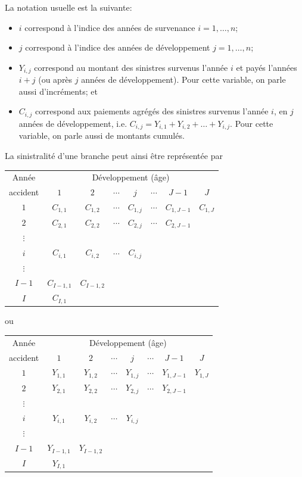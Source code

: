 La notation usuelle est la suivante:
\begin{itemize}
\item $i$ correspond à l'indice des années de survenance
  $i=1,\ldots,n$;
\item $j$ correspond à l'indice des années de développement
  $j=1,\ldots,n$;
\item $Y_{i,j}$ correspond au montant des sinistres survenus l'année
  $i$ et payés l'années $i+j$ (ou après $j$ années de développement).
  Pour cette variable, on parle aussi d'incréments; et
\item $C_{i,j}$ correspond aux paiements agrégés des sinistres
  survenus l'année $i$, en $j$ années de développement, i.e.
  $C_{i,j} = Y_{i,1} + Y_{i,2}+\ldots+Y_{i,j}$. Pour cette variable,
  on parle aussi de montants cumulés.
\end{itemize}

La sinistralité d'une branche peut ainsi être représentée par
\begin{center}
  \begin{tabular}{*{8}{c}}
    \toprule
    Année & \multicolumn{7}{c}{Développement (âge)} \\
    accident & $1$ & $2$ & $\cdots$ & $j$ & $\cdots$ & $J - 1$ & $J$ \\
    \midrule
    $1$ & $C_{1, 1}$ & $C_{1, 2}$ & $\cdots$ & $C_{1, j}$ & $\cdots$ & $C_{1, J-1}$ & $C_{1, J}$ \\
    $2$ & $C_{2, 1}$ & $C_{2, 2}$ & $\cdots$ & $C_{2, j}$ & $\cdots$ & $C_{2, J-1}$ \\
    $\vdots$ \\
    $i$ & $C_{i, 1}$ & $C_{i, 2}$ & $\cdots$ & $C_{i, j}$ \\
    $\vdots$ \\
    $I - 1$ & $C_{I-1, 1}$ & $C_{I-1, 2}$ \\
    $I$ & $C_{I, 1}$ \\
    \bottomrule
  \end{tabular}
\end{center}
ou
\begin{center}
  \begin{tabular}{*{8}{c}}
    \toprule
    Année & \multicolumn{7}{c}{Développement (âge)} \\
    accident & $1$ & $2$ & $\cdots$ & $j$ & $\cdots$ & $J - 1$ & $J$ \\
    \midrule
    $1$ & $Y_{1, 1}$ & $Y_{1, 2}$ & $\cdots$ & $Y_{1, j}$ & $\cdots$ & $Y_{1, J-1}$ & $Y_{1, J}$ \\
    $2$ & $Y_{2, 1}$ & $Y_{2, 2}$ & $\cdots$ & $Y_{2, j}$ & $\cdots$ & $Y_{2, J-1}$ \\
    $\vdots$ \\
    $i$ & $Y_{i, 1}$ & $Y_{i, 2}$ & $\cdots$ & $Y_{i, j}$ \\
    $\vdots$ \\
    $I - 1$ & $Y_{I-1, 1}$ & $Y_{I-1, 2}$ \\
    $I$ & $Y_{I, 1}$ \\
    \bottomrule
  \end{tabular}
\end{center}

